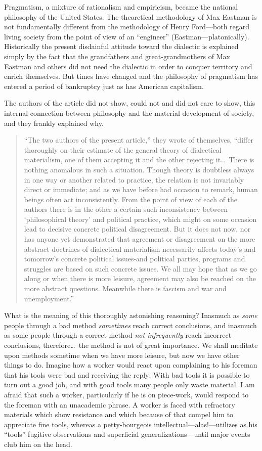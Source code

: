 Pragmatism, a mixture of rationalism and empiricism, became the national philosophy of the United States. The theoretical methodology of Max Eastman is not fundamentally different from the methodology of Henry Ford---both regard living society from the point of view of an “engineer” (Eastman---platonically). Historically the present disdainful attitude toward the dialectic is explained simply by the fact that the grandfathers and great-grandmothers of Max Eastman and others did not need the dialectic in order to conquer territory and enrich themselves. But times have changed and the philosophy of pragmatism has entered a period of bankruptcy just as has American capitalism.

The authors of the article did not show, could not and did not care to show, this internal connection between philosophy and the material development of society, and they frankly explained why.

\begin{quote}
  “The two authors of the present article,” they wrote of themselves, “differ thoroughly on their estimate of the general theory of dialectical materialism, one of them accepting it and the other rejecting it\dots\ There is nothing anomalous in such a situation. Though theory is doubtless always in one way or another related to practice, the relation is not invariably direct or immediate; and as we have before had occasion to remark, human beings often act inconsistently. From the point of view of each of the authors there is in the other a certain such inconsistency between ‘philosophical theory’ and political practice, which might on some occasion lead to decisive concrete political disagreement. But it does not now, nor has anyone yet demonstrated that agreement or disagreement on the more abstract doctrines of dialectical materialism necessarily affects today’s and tomorrow’s concrete political issues-and political parties, programs and struggles are based on such concrete issues. We all may hope that as we go along or when there is more leisure, agreement may also be reached on the more abstract questions. Meanwhile there is fascism and war and unemployment.”
\end{quote}

What is the meaning of this thoroughly astonishing reasoning? Inasmuch as \emph{some} people through a bad method \emph{sometimes} reach correct conclusions, and inasmuch as some people through a correct method \emph{not infrequently} reach incorrect conclusions, therefore\dots\ the method is not of great importance. We shall meditate upon methods sometime when we have more leisure, but now we have other things to do. Imagine how a worker would react upon complaining to his foreman that his tools were bad and receiving the reply: With bad tools it is possible to turn out a good job, and with good tools many people only waste material. I am afraid that such a worker, particularly if he is on piece-work, would respond to the foreman with an unacademic phrase. A worker is faced with refractory materials which show resistance and which because of that compel him to appreciate fine tools, whereas a petty-bourgeois intellectual---alas!---utilizes as his “tools” fugitive observations and superficial generalizations---until major events club him on the head.


